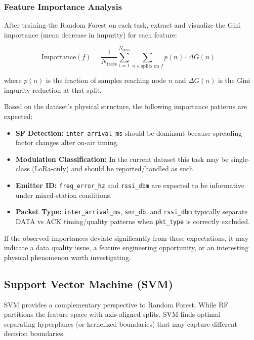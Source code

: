 \documentclass[11pt,letterpaper]{article}
\begin{document}
	\subsubsection{Feature Importance Analysis}

	After training the Random Forest on each task, extract and visualize the Gini importance (mean decrease in impurity) for each feature:

	\begin{equation}
		\text{Importance}(f) = \frac{1}{N_{\text{trees}}} \sum_{t=1}^{N_{\text{trees}}} \sum_{n \in \text{splits on } f} p(n) \cdot \Delta G(n)
		\label{eq:gini_importance}
	\end{equation}

	where $p(n)$ is the fraction of samples reaching node $n$ and $\Delta G(n)$ is the Gini impurity reduction at that split.

	\begin{tcolorbox}[infobox={Expected Feature Importance Patterns}]
		Based on the dataset's physical structure, the following importance patterns are expected:
		\begin{itemize}
			\item \textbf{SF Detection:} \texttt{inter\_arrival\_ms} should be dominant because spreading-factor changes alter on-air timing.
			\item \textbf{Modulation Classification:} In the current dataset this task may be single-class (LoRa-only) and should be reported/handled as such.
			\item \textbf{Emitter ID:} \texttt{freq\_error\_hz} and \texttt{rssi\_dbm} are expected to be informative under mixed-station conditions.
			\item \textbf{Packet Type:} \texttt{inter\_arrival\_ms}, \texttt{snr\_db}, and \texttt{rssi\_dbm} typically separate DATA vs ACK timing/quality patterns when \texttt{pkt\_type} is correctly excluded.
		\end{itemize}
		If the observed importances deviate significantly from these expectations, it may indicate a data quality issue, a feature engineering opportunity, or an interesting physical phenomenon worth investigating.
	\end{tcolorbox}

	\subsection{Support Vector Machine (SVM)}

	SVM provides a complementary perspective to Random Forest. While RF partitions the feature space with axis-aligned splits, SVM finds optimal separating hyperplanes (or kernelized boundaries) that may capture different decision boundaries.
\end{document}
